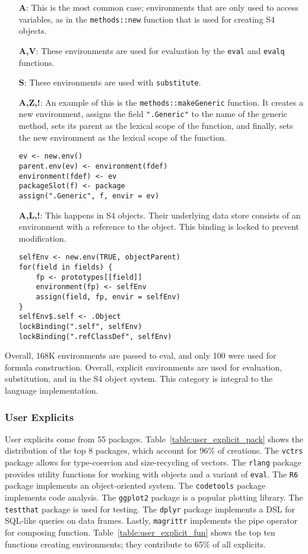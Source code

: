 \documentclass[sigplan,screen]{acmart}
\renewcommand{\c}[1]{\lstinline |#1|\xspace}
\begin{document}
\begin{itemize}
\item[{\bf A}:] This is the most common case; environments that are only used to
  access variables, as in the \c{methods::new} function that is used for
  creating S4 objects.
\item[{\bf A,V}:] These environments are used for evaluation by the \c{eval} and
  \c{evalq} functions.
\item[{\bf S}:] These environments are used with \c{substitute}.
\item[{\bf A,Z,!}:] An example of this is the \c{methods::makeGeneric} function.
  It creates a new environment, assigns the field \c{".Generic"} to the name of
  the generic method, sets its parent as the lexical scope of the function, and
  finally, sets the new environment as the lexical scope of the function.
\begin{lstlisting}
ev <- new.env()
parent.env(ev) <- environment(fdef)
environment(fdef) <- ev
packageSlot(f) <- package
assign(".Generic", f, envir = ev)
\end{lstlisting}\medskip

\item[{\bf A,L,!}:] This happens in S4 objects. Their underlying data store
  consists of an environment with a reference to the object. This binding is
  locked to prevent modification.
\begin{lstlisting}
selfEnv <- new.env(TRUE, objectParent)
for(field in fields) {
    fp <- prototypes[[field]]
    environment(fp) <- selfEnv
    assign(field, fp, envir = selfEnv)
}
selfEnv$.self <- .Object
lockBinding(".self", selfEnv)
lockBinding(".refClassDef", selfEnv)
\end{lstlisting}

\end{itemize}

\noindent
Overall, 168K environments are passed to eval, and only 100 were used for
formula construction. Overall, explicit environments are used for evaluation,
substitution, and in the S4 object system. This category is integral to the
language implementation.

\subsubsection{User Explicits}

User explicits come from 55 packages. Table~\ref{table:user_explicit_pack} shows
the distribution of the top 8 packages, which account for 96\% of creations. The
\c{vctrs} package allows for type-coercion and size-recycling of vectors. The
\c{rlang} package provides utility functions for working with objects and a
variant of \c{eval}. The \c{R6} package implements an object-oriented system.
The \c{codetools} package implements code analysis. The \c{ggplot2} package is a
popular plotting library. The \c{testthat} package is used for testing. The
\c{dplyr} package implements a DSL for SQL-like queries on data frames. Lastly,
\c{magrittr} implements the pipe operator for composing function.
Table~\ref{table:user_explicit_fun} shows the top ten functions creating
environments; they contribute to 65\% of all explicits.
\end{document}
